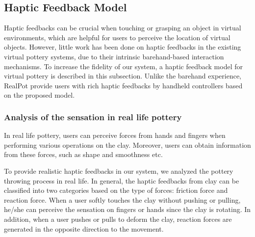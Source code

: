 \documentclass{svjour3}                     %
\begin{document}
\subsection{Haptic Feedback Model}

Haptic feedbacks can be crucial when touching or grasping an object in virtual environments, which are helpful for users to perceive the location of virtual objects.
However, little work has been done on haptic feedbacks in the existing virtual pottery systems, due to their intrinsic barehand-based interaction mechanisms.
To increase the fidelity of our system, a haptic feedback model for virtual pottery is described  in this subsection.
Unlike the barehand experience, RealPot provide users with rich haptic feedbacks by handheld controllers based on the proposed model.

















\subsubsection{Analysis of the sensation in real life pottery}

In real life pottery, users can perceive forces from hands and fingers when performing various operations on the clay.
Moreover, users can obtain information from these forces, such as shape and smoothness etc.

To provide realistic haptic feedbacks in our system, we analyzed the pottery throwing process in real life.
In general, the haptic feedbacks from clay can be classified into two categories based on the type of forces: friction force and reaction force.
When a user softly touches the clay without pushing or pulling, he/she can perceive the sensation on fingers or hands since the clay is rotating.
In addition, when a user pushes or pulls to deform the clay, reaction forces are generated in the opposite direction to the movement.
\end{document}

